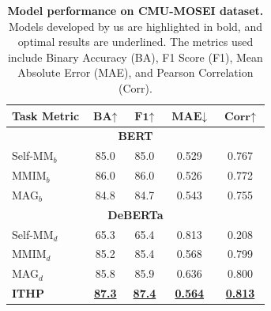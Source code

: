 \begin{table}[!htb]
\vspace{0.2 cm}
\setlength{\abovecaptionskip}{0.3 cm}
\setlength{\belowcaptionskip}{0.3 cm} 
\renewcommand{\arraystretch}{1.26}
\centering
\setlength\tabcolsep{15.6 pt}
\begin{tabular}{@{}lcccc@{}}
    \toprule\toprule
    \textbf{Task Metric} & $\textbf{BA}{\uparrow}$ & $\textbf{F1}{\uparrow}$ & $\textbf{MAE}{\downarrow}$ & $\textbf{Corr}{\uparrow}$ \\
    \hline
    \multicolumn{5}{c}{\textbf{BERT}} \\
    \hline
    Self-MM$_b$ \citep{han2021improving} & 85.0 & 85.0 & 0.529 & 0.767 \\
    MMIM$_b$ \citep{han2021improving} & 86.0 & 86.0 & 0.526 & 0.772 \\
    MAG$_b$ \citep{han2021improving} & 84.8 & 84.7 & 0.543 & 0.755 \\
    \hline
    \multicolumn{5}{c}{\textbf{DeBERTa}} \\
    \hline
    Self-MM$_d$ & 65.3 & 65.4 & 0.813 & 0.208 \\
    MMIM$_d$ & 85.2 & 85.4 & 0.568 & 0.799 \\
    MAG$_d$ & 85.8 & 85.9 & 0.636 & 0.800 \\
    \textbf{ITHP} & \textbf{\uline{87.3}} & \textbf{\uline{87.4}} & \textbf{\uline{0.564}} & \textbf{\uline{0.813}} \\
    \bottomrule\bottomrule
\end{tabular}
\caption{\textbf{Model performance on CMU-MOSEI dataset.} Models developed by us are highlighted in bold, and optimal results are underlined. The metrics used include Binary Accuracy (BA), F1 Score (F1), Mean Absolute Error (MAE), and Pearson Correlation (Corr).}
\label{tab:perMOSEIdet}
\end{table}
